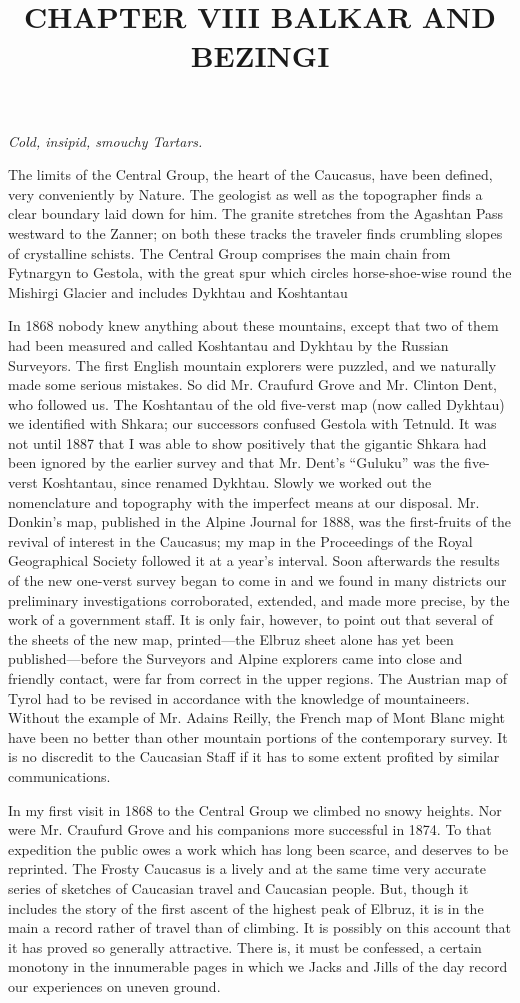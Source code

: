 \documentclass{article}
\title{CHAPTER VIII BALKAR AND BEZINGI}
\begin{document}
	
	\begin{flushright}
		\textit{Cold, insipid, smouchy Tartars.}
	\end{flushright}
	The limits of the Central Group, the heart of the Caucasus, have been defined, very conveniently by Nature. The geologist as well as the topographer finds a clear boundary laid down for him. The granite stretches from the Agashtan Pass westward to the Zanner; on both these tracks the traveler finds crumbling slopes of crystalline schists. The Central Group comprises the main chain from Fytnargyn to Gestola, with the great spur which circles horse-shoe-wise round the Mishirgi Glacier and includes Dykhtau and Koshtantau
	
	In 1868 nobody knew anything about these mountains, except that two of them had been measured and called Koshtantau and Dykhtau by the Russian Surveyors. The first English mountain explorers were puzzled, and we naturally made some serious mistakes. So did Mr. Craufurd Grove and Mr. Clinton Dent, who followed us. The Koshtantau of the old five-verst map (now called Dykhtau) we identified with Shkara; our successors confused Gestola with Tetnuld. It was not until 1887 that I was able to show positively that the gigantic Shkara had been ignored by the earlier survey and that Mr. Dent's “Guluku” was the five-verst Koshtantau, since renamed Dykhtau. Slowly we worked out the nomenclature and topography with the imperfect means at our disposal. Mr. Donkin's map, published in the Alpine Journal for 1888, was the first-fruits of the revival of interest in the Caucasus; my map in the Proceedings of the Royal Geographical Society followed it at a year's interval. Soon afterwards the results of the new one-verst survey began to come in and we found in many districts our preliminary investigations corroborated, extended, and made more precise, by the work of a government staff. It is only fair, however, to point out that several of the sheets of the new map, printed—the Elbruz sheet alone has yet been published—before the Surveyors and Alpine explorers came into close and friendly contact, were far from correct in the upper regions. The Austrian map of Tyrol had to be revised in accordance with the knowledge of mountaineers. Without the example of Mr. Adains Reilly, the French map of Mont Blanc might have been no better than other mountain portions of the contemporary survey. It is no discredit to the Caucasian Staff if it has to some extent profited by similar communications.
	
	In my first visit in 1868 to the Central Group we climbed no snowy heights. Nor were Mr. Craufurd Grove and his companions more successful in 1874. To that expedition the public owes a work which has long been scarce, and deserves to be reprinted. The Frosty Caucasus is a lively and at the same time very accurate series of sketches of Caucasian travel and Caucasian people. But, though it includes the story of the first ascent of the highest peak of Elbruz, it is in the main a record rather of travel than of climbing. It is possibly on this account that it has proved so generally attractive. There is, it must be confessed, a certain monotony in the innumerable pages in which we Jacks and Jills of the day record our experiences on uneven ground.
	
\end{document}
